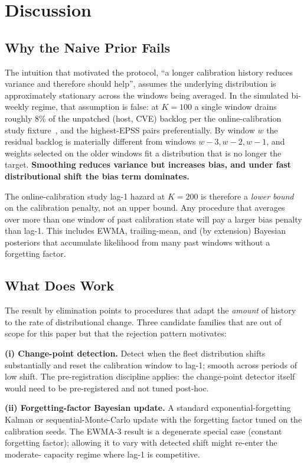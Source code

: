 \section{Discussion}

\subsection{Why the Naive Prior Fails}

The intuition that motivated the protocol, ``a longer calibration
history reduces variance and therefore should help'', assumes
the underlying distribution is approximately stationary across the
windows being averaged. In the simulated bi-weekly regime, that
assumption is false: at $K = 100$ a single window drains roughly
8\% of the unpatched (host, CVE) backlog per the online-calibration study
fixture~\cite{paper7online}, and the highest-EPSS pairs
preferentially. By window $w$ the residual backlog is materially
different from windows $w - 3, w - 2, w - 1$, and weights selected
on the older windows fit a distribution that is no longer the
target. \textbf{Smoothing reduces variance but increases bias, and
under fast distributional shift the bias term dominates.}

The online-calibration study lag-1 hazard at $K = 200$ is therefore a \textit{lower
bound} on the calibration penalty, not an upper bound. Any procedure
that averages over more than one window of past calibration state
will pay a larger bias penalty than lag-1. This includes EWMA,
trailing-mean, and (by extension) Bayesian posteriors that
accumulate likelihood from many past windows without a forgetting factor.

\subsection{What Does Work}

The result by elimination points to procedures that adapt the
\textit{amount} of history to the rate of distributional change.
Three candidate families that are out of scope for this paper but
that the rejection pattern motivates:

\textbf{(i) Change-point detection.} Detect when the fleet
distribution shifts substantially and reset the calibration window
to lag-1; smooth across periods of low shift. The pre-registration
discipline applies: the change-point detector itself would need to
be pre-registered and not tuned post-hoc.

\textbf{(ii) Forgetting-factor Bayesian update.} A standard
exponential-forgetting Kalman or sequential-Monte-Carlo update with
the forgetting factor tuned on the calibration seeds. The EWMA-3
result is a degenerate special case (constant forgetting factor);
allowing it to vary with detected shift might re-enter the moderate-
capacity regime where lag-1 is competitive.

